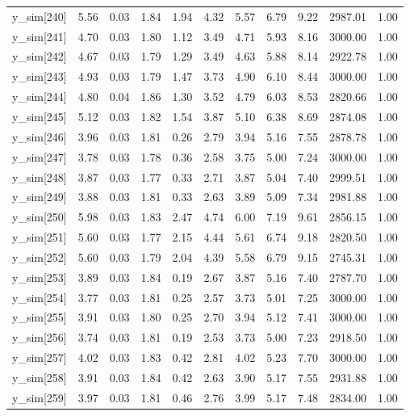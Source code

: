 \begin{table}[ht]
\begin{tabular}{rrrrrrrrrrr}
  y\_sim[240] & 5.56 & 0.03 & 1.84 & 1.94 & 4.32 & 5.57 & 6.79 & 9.22 & 2987.01 & 1.00 \\ 
  y\_sim[241] & 4.70 & 0.03 & 1.80 & 1.12 & 3.49 & 4.71 & 5.93 & 8.16 & 3000.00 & 1.00 \\ 
  y\_sim[242] & 4.67 & 0.03 & 1.79 & 1.29 & 3.49 & 4.63 & 5.88 & 8.14 & 2922.78 & 1.00 \\ 
  y\_sim[243] & 4.93 & 0.03 & 1.79 & 1.47 & 3.73 & 4.90 & 6.10 & 8.44 & 3000.00 & 1.00 \\ 
  y\_sim[244] & 4.80 & 0.04 & 1.86 & 1.30 & 3.52 & 4.79 & 6.03 & 8.53 & 2820.66 & 1.00 \\ 
  y\_sim[245] & 5.12 & 0.03 & 1.82 & 1.54 & 3.87 & 5.10 & 6.38 & 8.69 & 2874.08 & 1.00 \\ 
  y\_sim[246] & 3.96 & 0.03 & 1.81 & 0.26 & 2.79 & 3.94 & 5.16 & 7.55 & 2878.78 & 1.00 \\ 
  y\_sim[247] & 3.78 & 0.03 & 1.78 & 0.36 & 2.58 & 3.75 & 5.00 & 7.24 & 3000.00 & 1.00 \\ 
  y\_sim[248] & 3.87 & 0.03 & 1.77 & 0.33 & 2.71 & 3.87 & 5.04 & 7.40 & 2999.51 & 1.00 \\ 
  y\_sim[249] & 3.88 & 0.03 & 1.81 & 0.33 & 2.63 & 3.89 & 5.09 & 7.34 & 2981.88 & 1.00 \\ 
  y\_sim[250] & 5.98 & 0.03 & 1.83 & 2.47 & 4.74 & 6.00 & 7.19 & 9.61 & 2856.15 & 1.00 \\ 
  y\_sim[251] & 5.60 & 0.03 & 1.77 & 2.15 & 4.44 & 5.61 & 6.74 & 9.18 & 2820.50 & 1.00 \\ 
  y\_sim[252] & 5.60 & 0.03 & 1.79 & 2.04 & 4.39 & 5.58 & 6.79 & 9.15 & 2745.31 & 1.00 \\ 
  y\_sim[253] & 3.89 & 0.03 & 1.84 & 0.19 & 2.67 & 3.87 & 5.16 & 7.40 & 2787.70 & 1.00 \\ 
  y\_sim[254] & 3.77 & 0.03 & 1.81 & 0.25 & 2.57 & 3.73 & 5.01 & 7.25 & 3000.00 & 1.00 \\ 
  y\_sim[255] & 3.91 & 0.03 & 1.80 & 0.25 & 2.70 & 3.94 & 5.12 & 7.41 & 3000.00 & 1.00 \\ 
  y\_sim[256] & 3.74 & 0.03 & 1.81 & 0.19 & 2.53 & 3.73 & 5.00 & 7.23 & 2918.50 & 1.00 \\ 
  y\_sim[257] & 4.02 & 0.03 & 1.83 & 0.42 & 2.81 & 4.02 & 5.23 & 7.70 & 3000.00 & 1.00 \\ 
  y\_sim[258] & 3.91 & 0.03 & 1.84 & 0.42 & 2.63 & 3.90 & 5.17 & 7.55 & 2931.88 & 1.00 \\ 
  y\_sim[259] & 3.97 & 0.03 & 1.81 & 0.46 & 2.76 & 3.99 & 5.17 & 7.48 & 2834.00 & 1.00 \\ 

\end{tabular}
\end{table}
